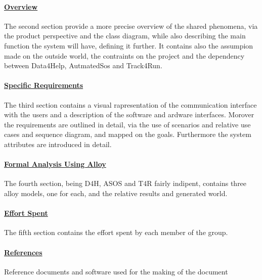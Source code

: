 \paragraph{\hyperref[sect:overview]{Overview}} The second section provide a more precise overview of the shared phenomena, via the product perspective and the class diagram, while also describing the main function the system will have, defining it further. It contains also the assumpion made on the outside world, the contraints on the project and the dependency between Data4Help, AutmatedSos and Track4Run.
\paragraph{\hyperref[sect:requirements]{Specific Requirements}} The third section contains a visual rapresentation of the communication interface with the users and a description of the software and ardware interfaces. Morover the requirements are outlined in detail, via the use of scenarios and relative use cases and sequence diagram, and mapped on the goals. Furthermore the system attributes are introduced in detail.
\paragraph{\hyperref[sect:alloy]{Formal Analysis Using Alloy}} The fourth section, being D4H, ASOS and T4R fairly indipent, contains three alloy models, one for each, and the relative results and generated world.
\paragraph{\hyperref[sect:effort]{Effort Spent}} The fifth section contains the effort spent by each member of the group.
\paragraph{\hyperref[sect:references]{References}} Reference documents and software used for the making of the document


